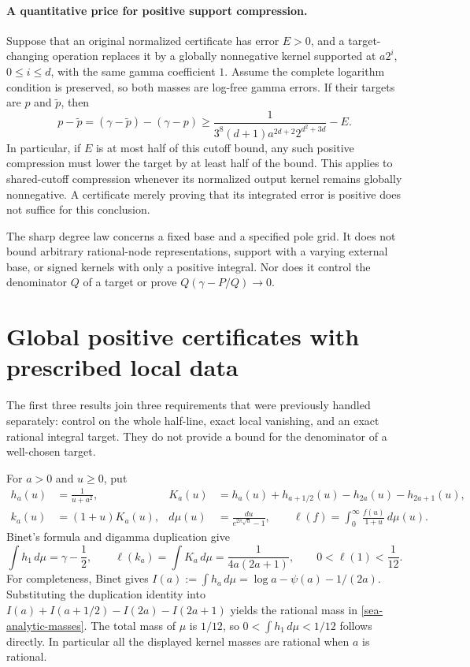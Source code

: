 \documentclass[11pt,a4paper]{article}
\theoremstyle{definition}
\theoremstyle{remark}
\begin{document}
\paragraph{A quantitative price for positive support compression.}
Suppose that an original normalized certificate has error $E>0$, and a
target-changing operation replaces it by a globally nonnegative kernel
supported at $a2^i$, $0\le i\le d$, with the same gamma coefficient $1$.
Assume the complete logarithm condition is preserved, so both masses are
log-free gamma errors.  If their targets are $p$ and $\widetilde p$, then
\[
 p-\widetilde p
 = (\gamma-\widetilde p)-(\gamma-p)
 \ge\frac{1}{3^8(d+1)a^{2d+2}2^{d^2+3d}}-E.
\]
In particular, if $E$ is at most half of this cutoff bound, any such
positive compression must lower the target by at least half of the
bound.  This applies to shared-cutoff compression whenever its normalized
output kernel remains globally nonnegative.  A certificate merely proving
that its integrated error is positive does not suffice for this conclusion.

The sharp degree law concerns a fixed base and a specified pole grid.
It does not bound arbitrary rational-node representations, support with a
varying external base, or signed kernels with only a positive integral.
Nor does it control the denominator $Q$ of a target or prove
$Q(\gamma-P/Q)\to0$.

\section{Global positive certificates with prescribed local data}
\label{sea-analytic}

The first three results join three requirements that were previously handled
separately: control on the whole half-line, exact local vanishing, and an exact
rational integral target. They do not provide a bound for the denominator of
a well-chosen target.

For $a>0$ and $u\geq0$, put
\begin{align}
h_a(u)&=\frac1{u+a^2},&
K_a(u)&=h_a(u)+h_{a+1/2}(u)-h_{2a}(u)-h_{2a+1}(u),\\
k_a(u)&=(1+u)K_a(u),&
d\mu(u)&=\frac{du}{e^{2\pi\sqrt{u}}-1},\qquad
\ell(f)=\int_0^\infty\frac{f(u)}{1+u}\,d\mu(u).
\end{align}
Binet's formula and digamma duplication \cite{dlmf-binet,dlmf-duplication}
give
\begin{equation}\label{sea-analytic-masses}
\int h_1\,d\mu=\gamma-\frac12,\qquad
\ell(k_a)=\int K_a\,d\mu=\frac1{4a(2a+1)},\qquad
0<\ell(1)<\frac1{12}.
\end{equation}
For completeness, Binet gives $I(a):=\int h_a\,d\mu
=\log a-\psi(a)-1/(2a)$. Substituting the duplication identity into
$I(a)+I(a+1/2)-I(2a)-I(2a+1)$ yields the rational mass in
\eqref{sea-analytic-masses}. The total mass of $\mu$ is $1/12$,
so $0<\int h_1\,d\mu<1/12$ follows directly. In particular all the
displayed kernel masses are rational when $a$ is rational.
\end{document}
